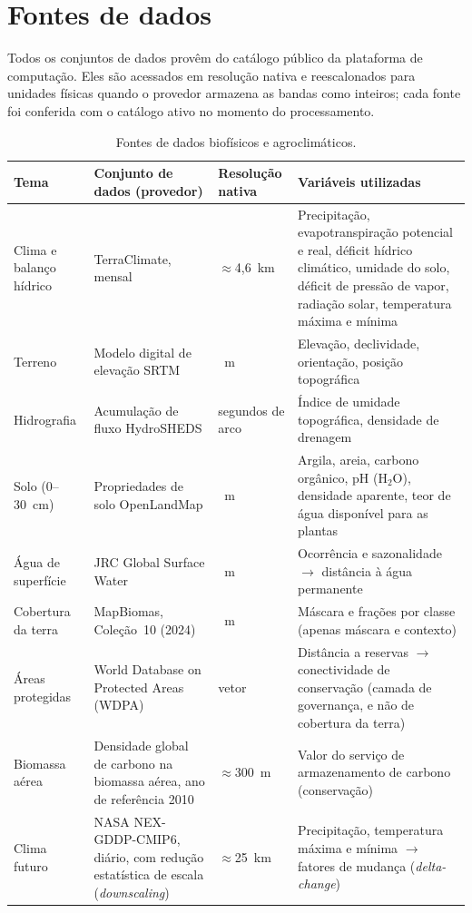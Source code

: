 \chapter{Fontes de dados}\label{anx:data}

Todos os conjuntos de dados provêm do catálogo público da plataforma de computação. Eles são acessados
em resolução nativa e reescalonados para unidades físicas quando o provedor armazena as bandas como
inteiros; cada fonte foi conferida com o catálogo ativo no momento do processamento.

\begin{table}[htbp]
\centering
\caption{Fontes de dados biofísicos e agroclimáticos.}
\label{tab:src-biophys}
\begin{tabular}{@{}>{\raggedright\arraybackslash}p{2.7cm}>{\raggedright\arraybackslash}p{3.6cm}>{\raggedright\arraybackslash}p{2cm}>{\raggedright\arraybackslash}p{5.5cm}@{}}
\toprule
Tema & Conjunto de dados (provedor) & Resolução nativa & Variáveis utilizadas \\
\midrule
Clima e balanço hídrico & TerraClimate, mensal & $\approx$4,6~km & Precipitação,
  evapotranspiração potencial e real, déficit hídrico climático, umidade do solo, déficit de
  pressão de vapor, radiação solar, temperatura máxima e mínima \\
Terreno & Modelo digital de elevação SRTM & 30~m & Elevação, declividade, orientação, posição
  topográfica \\
Hidrografia & Acumulação de fluxo HydroSHEDS & 15 segundos de arco & Índice de umidade
  topográfica, densidade de drenagem \\
Solo (0--30~cm) & Propriedades de solo OpenLandMap & 250~m & Argila, areia, carbono orgânico,
  pH (H$_2$O), densidade aparente, teor de água disponível para as plantas \\
Água de superfície & JRC Global Surface Water & 30~m & Ocorrência e sazonalidade
  $\rightarrow$ distância à água permanente \\
Cobertura da terra & MapBiomas, Coleção~10 (2024) & 30~m & Máscara e frações por classe
  (apenas máscara e contexto) \\
Áreas protegidas & World Database on Protected Areas (WDPA) & vetor & Distância a reservas
  $\rightarrow$ conectividade de conservação (camada de governança, e não de cobertura da
  terra) \\
Biomassa aérea & Densidade global de carbono na biomassa aérea, ano de
  referência 2010 \citep[p.~1]{spawn_harmonized_2020} & $\approx$300~m & Valor do serviço de
  armazenamento de carbono (conservação) \\
Clima futuro & NASA NEX-GDDP-CMIP6, diário, com redução estatística de escala (\emph{downscaling}) &
  $\approx$25~km & Precipitação, temperatura máxima e mínima $\rightarrow$ fatores de mudança
  (\emph{delta-change}) \\
\bottomrule
\end{tabular}
\end{table}

